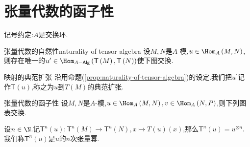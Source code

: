 \section{张量代数的函子性}

记号约定:$A$是交换环.

\begin{proposition}{张量代数的自然性}{naturality-of-tensor-algebra}
	设$M,N$是$A$-模,$u\in\Hom_{A}\left(M,N\right)$,则存在唯一的$u^{\prime}\in\Hom_{A-\mathsf{Alg}}\left(\mathsf{T}\left(M\right),\mathsf{T}\left(N\right)\right)$使下图交换.
	\begin{center}
	\end{center}
\end{proposition}

\begin{definition}{映射的典范扩张}{}
	沿用命题(\ref{prop:naturality-of-tensor-algebra})的设定.我们把$u^{\prime}$记作$\mathsf{T}\left(u\right)$,称之为$u$到$T\left(M\right)$的典范扩张.
\end{definition}

\begin{proposition}{张量代数的函子性}{}
	设$M,N$是$A$-模,$u\in\Hom_{A}\left(M,N\right),v\in\Hom_{A}\left(N,P\right)$,则下列图表交换.
	\begin{center}
	\end{center}
\end{proposition}

\begin{remark}{}{}
	设$n\in\N$.记$\mathsf{T}^{n}\left(u\right):\mathsf{T}^{n}\left(M\right)\to\mathsf{T}^{n}\left(N\right),x\mapsto T\left(u\right)\left(x\right)$,那么$\mathsf{T}^{n}\left(u\right)=u^{\otimes n}$.我们称$\mathsf{T}^{n}\left(u\right)$是$u$的$n$次张量幂.
\end{remark}

